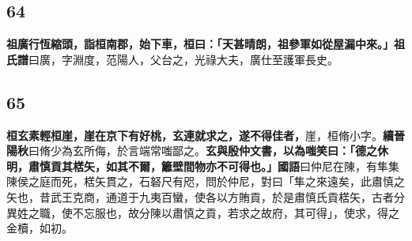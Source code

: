 \subsection*{64}

\textbf{祖廣行恆縮頭，詣桓南郡，始下車，桓曰：「天甚晴朗，祖參軍如從屋漏中來。」}{\footnotesize \textbf{祖氏譜}曰廣，字淵度，范陽人，父台之，光祿大夫，廣仕至護軍長史。}

\subsection*{65}

\textbf{桓玄素輕桓崖，崖在京下有好桃，玄連就求之，遂不得佳者，}{\footnotesize 崖，桓脩小字。\textbf{續晉陽秋}曰脩少為玄所侮，於言端常嗤鄙之。}\textbf{玄與殷仲文書，以為嗤笑曰：「德之休明，肅慎貢其楛矢，如其不爾，籬壁間物亦不可得也。」}{\footnotesize \textbf{國語}曰仲尼在陳，有隼集陳侯之庭而死，楛矢貫之，石砮尺有咫，問於仲尼，對曰「隼之來遠矣，此肅慎之矢也，昔武王克商，通道于九夷百蠻，使各以方賄貢，於是肅慎氏貢楛矢，古者分異姓之職，使不忘服也，故分陳以肅慎之貢，若求之故府，其可得」，使求，得之金櫝，如初。}